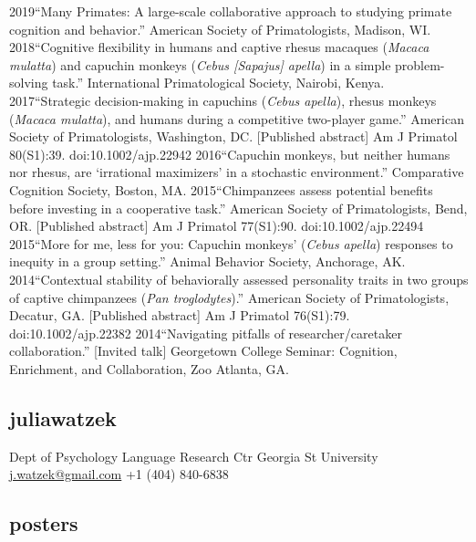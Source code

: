 \documentclass[]{friggeri-cv}
\begin{document}
\begin{entrylist2}
  \entrytwo
    {2019}{``Many Primates: A large-scale collaborative approach to studying primate cognition and behavior.'' American Society of Primatologists, Madison, WI.}
  \entrytwo
    {2018}{``Cognitive flexibility in humans and captive rhesus macaques (\emph{Macaca mulatta}) and capuchin monkeys (\emph{Cebus [Sapajus] apella}) in a simple problem-solving task.'' International Primatological Society, Nairobi, Kenya.}
  \entrytwo
    {2017}{``Strategic decision-making in capuchins (\emph{Cebus apella}), rhesus monkeys (\emph{Macaca mulatta}), and humans during a competitive two-player game.'' American Society of Primatologists, Washington, DC. [Published abstract] Am J Primatol 80(S1):39. doi:10.1002/ajp.22942}
  \entrytwo
    {2016}{``Capuchin monkeys, but neither humans nor rhesus, are `irrational maximizers' in a stochastic environment.'' Comparative Cognition Society, Boston, MA.}
  \entrytwo
    {2015}{``Chimpanzees assess potential benefits before investing in a cooperative task.'' American Society of Primatologists, Bend, OR. [Published abstract] Am J Primatol 77(S1):90. doi:10.1002/ajp.22494}
  \entrytwo
    {2015}{``More for me, less for you: Capuchin monkeys' (\emph{Cebus apella}) responses to inequity in a group setting.'' Animal Behavior Society, Anchorage, AK.}
  \entrytwo
    {2014}{``Contextual stability of behaviorally assessed personality traits in two groups of captive chimpanzees (\emph{Pan troglodytes}).'' American Society of Primatologists, Decatur, GA. [Published abstract] Am J Primatol 76(S1):79. doi:10.1002/ajp.22382}
  \entrytwo
    {2014}{``Navigating pitfalls of researcher/caretaker collaboration.'' [Invited talk] Georgetown College Seminar: Cognition, Enrichment, and Collaboration, Zoo Atlanta, GA.}
\end{entrylist2}

\begin{aside}
  \section{{\normalfont julia}watzek}
    Dept of Psychology
    Language Research Ctr
    Georgia St University
    ~
    \href{mailto:j.watzek@gmail.com}{j.watzek@gmail.com}
    +1 (404) 840-6838
\end{aside}



\subsection{posters}
\end{document}
